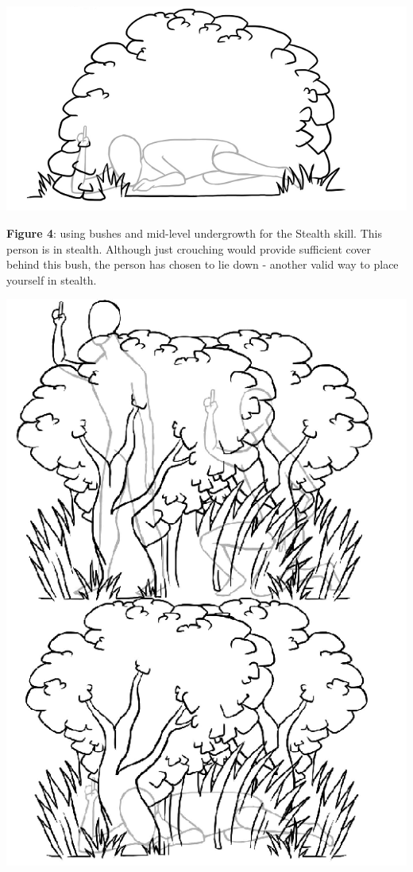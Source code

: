 \includegraphics[width=1\textwidth]{images/image5.png}

\textbf{Figure 4}: using bushes and mid-level undergrowth for the Stealth skill. This person is in stealth. Although just crouching would provide sufficient cover behind this bush, the person has chosen to lie down - another valid way to place yourself in stealth.

\includegraphics[width=1\textwidth]{images/image6.png}

